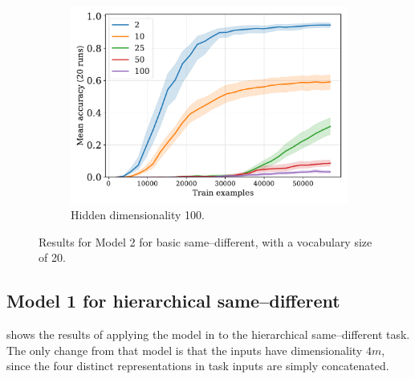 \begin{figure}[H]
  \begin{subfigure}{0.45\linewidth}
    \includegraphics[width=1\textwidth]{../fig/fuzzy-lm-vocab20-pretrain-3tasks-train_size-embed_dim-hidden_dim=100.pdf}
    \caption{Hidden dimensionality 100.}
    \label{fig:model2-rep}
  \end{subfigure}

  \caption{Results for Model 2 for basic same--different, with a vocabulary size of 20.}
  \label{fig:model2}
\end{figure}


\newpage


\subsection{Model 1 for hierarchical same--different}\label{app:model1-premack}

 shows the results of applying the model in  to the hierarchical same--different task. The only change from that model is that the inputs have dimensionality $4m$, since the four distinct representations in task inputs are simply concatenated.


